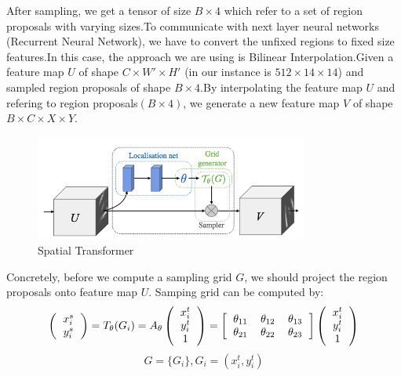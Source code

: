 \documentclass[12pt,a4paper]{report}
\begin{document}
 
After  sampling, we get a tensor of size $B\times 4$ which refer to a set of  region proposals with varying sizes.To communicate with next layer neural networks (Recurrent Neural Network), we have to convert the unfixed regions to fixed size features.In this case, the approach we are using is Bilinear Interpolation.Given a feature map $U$ of shape $C\times W'\times H'$ (in our instance is $512\times 14\times 14$) and sampled region proposals of shape $B\times 4$.By interpolating the feature map $U$ and refering to region proposals$(B\times 4)$, we generate a new feature map $V$ of shape $B\times C\times X\times Y$. \\
\begin{figure}[h]
\centering
\includegraphics[width=0.8\textwidth]{transform.png}
\caption{Spatial Transformer\cite{spatial}}
\end{figure}


Concretely, before we compute a sampling grid $G$, we should project the region proposals onto feature map $U$.
Samping grid can be computed by:\\
\[ 
\left (
  \begin{tabular}{ccc}
  $x_i^s$ \\
  $y _i^s$
  \end{tabular}
\right ) =T_{\theta}(G_i)=A_{\theta}
\left (
  \begin{tabular}{ccc}
  $x_i^t$ \\
  $y _i^t$ \\
  1
  \end{tabular}
\right )=
\left [
  \begin{tabular}{ccc}
  $\theta_{11}$ &  $\theta_{12}$ &   $\theta_{13}$  \\
   $\theta_{21}$ &  $\theta_{22}$ &   $\theta_{23}$ 

  \end{tabular}
\right ] 
\left (
  \begin{tabular}{ccc}
  $x_i^t$ \\
  $y _i^t$ \\
  1
  \end{tabular}
\right )
\]
$$G=\{G_i\},G_i=(x_i^t,y_i^t)$$
\end{document}
